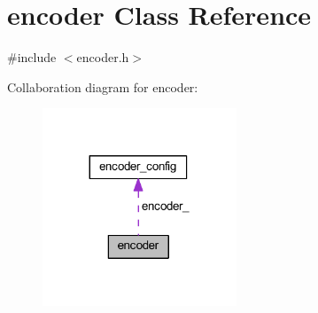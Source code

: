 \hypertarget{classencoder}{}\section{encoder Class Reference}
\label{classencoder}


{\ttfamily \#include $<$encoder.\+h$>$}



Collaboration diagram for encoder\+:
\nopagebreak
\begin{figure}[H]
\begin{center}
\leavevmode
\includegraphics[width=164pt]{classencoder__coll__graph}
\end{center}
\end{figure}

